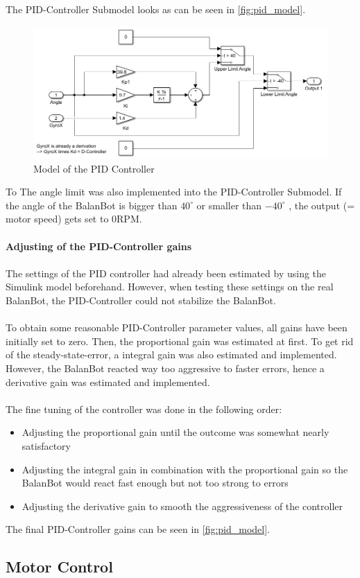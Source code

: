 The PID-Controller Submodel looks as can be seen in \autoref{fig:pid_model}.
\begin{figure}[H]
    \centering
    \includegraphics[width=\textwidth]{Lab_report/pics/hardware_impl/PID.PNG}
    \caption{Model of the PID Controller}
    \label{fig:pid_model}
\end{figure}
To 
The angle limit was also implemented into the PID-Controller Submodel. If the angle of the BalanBot is bigger than $40^\circ$ or smaller than $-40^\circ$ , the output (= motor speed) gets set to 0RPM.
\newline\\\\
\textbf{Adjusting of the PID-Controller gains}\\\\
The settings of the PID controller had already been estimated by using the Simulink model beforehand. However, when testing these settings on the real BalanBot, the PID-Controller could not stabilize the BalanBot.\\\\
To obtain some reasonable PID-Controller parameter values, all gains have been initially set to zero. Then, the proportional gain was estimated at first. To get rid of the steady-state-error, a integral gain was also estimated and implemented. However, the BalanBot reacted way too aggressive to faster errors, hence a derivative gain was estimated and implemented.\\\\
The fine tuning of the controller was done in the following order:
\begin{itemize}
    \item Adjusting the proportional gain until the outcome was somewhat nearly satisfactory
    \item Adjusting the integral gain in combination with the proportional gain so the BalanBot would react fast enough but not too strong to errors
    \item Adjusting the derivative gain to smooth the aggressiveness of the controller
\end{itemize}

The final PID-Controller gains can be seen in \autoref{fig:pid_model}.


\subsection{Motor Control}
